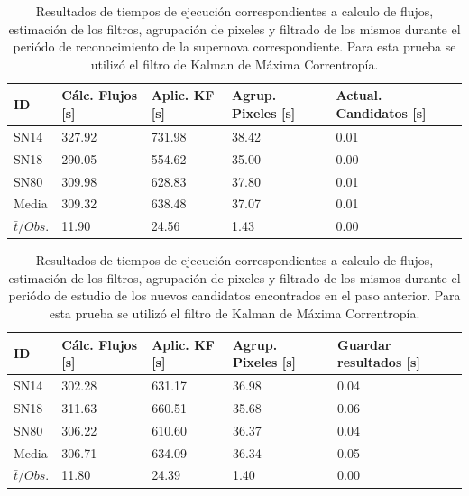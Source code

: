 \begin{table}[h]
\centering
\begin{tabular}{|l|l|l|l|l|}
\hline
\textbf{ID} & \textbf{C\'alc. Flujos [s]} & \textbf{Aplic. KF [s]} &  \textbf{Agrup. Pixeles [s]}  & \textbf{Actual. Candidatos [s]}\\ \hline \hline
SN14        & 327.92            & 731.98        &  38.42 & 0.01 \\ \hline
SN18            & 290.05             & 554.62         &  35.00  & 0.00\\ \hline
SN80            & 309.98             & 628.83         &   37.80 & 0.01 \\ \hline \hline 
Media & 309.32 & 638.48 &  37.07 & 0.01\\\hline
 $\bar{t}/Obs. $& 11.90 & 24.56 & 1.43 & 0.00\\\hline 
\end{tabular}
\label{tab:t3}
\caption{Resultados de tiempos de ejecuci\'on correspondientes a calculo de flujos, estimaci\'on de los filtros, agrupaci\'on de pixeles y filtrado de los mismos durante el peri\'odo de reconocimiento de la supernova correspondiente. Para esta prueba se utiliz\'o el filtro de Kalman de M\'axima Correntrop\'ia.}
\end{table}

\begin{table}[h]
\centering
\begin{tabular}{|l|l|l|l|l|}
\hline
\textbf{ID} & \textbf{C\'alc. Flujos [s]} & \textbf{Aplic. KF [s]} &  \textbf{Agrup. Pixeles [s]}  & \textbf{Guardar resultados [s]}\\ \hline \hline
SN14        & 302.28            & 631.17        &  36.98 & 0.04 \\ \hline
SN18            & 311.63             & 660.51         &  35.68  & 0.06\\ \hline
SN80            & 306.22             & 610.60         &   36.37 & 0.04 \\ \hline \hline
Media & 306.71 & 634.09 &  36.34 & 0.05\\\hline
 $\bar{t}/Obs. $& 11.80 & 24.39 & 1.40 & 0.00\\\hline  
\end{tabular}
\label{tab:t4}
\caption{Resultados de tiempos de ejecuci\'on correspondientes a calculo de flujos, estimaci\'on de los filtros, agrupaci\'on de pixeles y filtrado de los mismos durante el peri\'odo de estudio de los nuevos candidatos encontrados en el paso anterior. Para esta prueba se utiliz\'o el filtro de Kalman de M\'axima Correntrop\'ia.}
\end{table}

